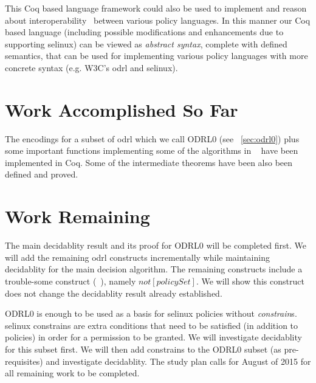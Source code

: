 This Coq based language framework could also be used to implement and reason about interoperability~\cite{prados2005interoperability, maronas2009architecture} between various policy languages. In this manner our Coq based language (including possible modifications and enhancements due to supporting \ac{selinux}) can be viewed as \emph{abstract syntax}, complete with defined semantics, that can be used for implementing various policy languages with more concrete syntax (e.g. W3C's \ac{odrl} and \ac{selinux}). 

\section{Work Accomplished So Far}

The encodings for a subset of \ac{odrl} which we call ODRL0 (see ~\ref{sec:odrl0}) plus some important functions implementing some of the algorithms in ~\cite{pucella2006} have been implemented in Coq. Some of the intermediate theorems have been also been defined and proved.

\section{Work Remaining}
The main decidablity result and its proof for ODRL0 will be completed first. We will add the remaining \ac{odrl} constructs incrementally while maintaining decidablity for the main decision algorithm. The remaining constructs include a trouble-some construct (~\cite{pucella2006}), namely $not[policySet]$. We will show this construct does not change the decidablity result already established. 

ODRL0 is enough to be used as a basis for \ac{selinux} policies without \emph{constrain}s. \ac{selinux} constrains are extra  conditions that need to be satisfied (in addition to policies) in order for a permission to be granted. We will investigate decidablity for this subset first. We will then add constrains to the ODRL0 subset (as pre-requisites) and investigate decidablity. The study plan calls for August of 2015 for all remaining work to be completed.













